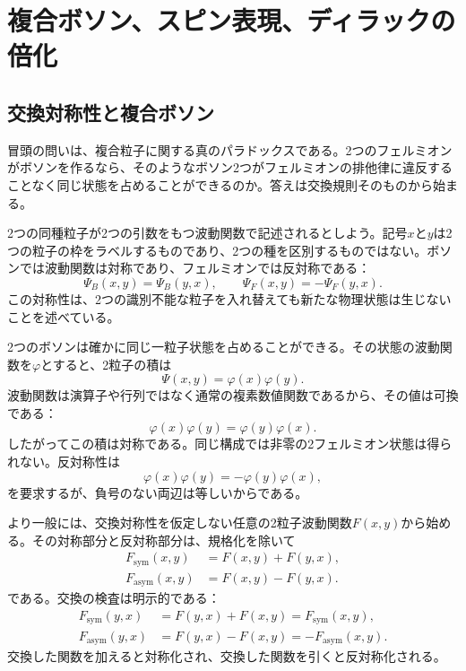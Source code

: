 \chapter{複合ボソン、スピン表現、ディラックの倍化}

\section{交換対称性と複合ボソン}

冒頭の問いは、複合粒子に関する真のパラドックスである。2つのフェルミオンがボソンを作るなら、そのようなボソン2つがフェルミオンの排他律に違反することなく同じ状態を占めることができるのか。答えは交換規則そのものから始まる。

2つの同種粒子が2つの引数をもつ波動関数で記述されるとしよう。記号\(x\)と\(y\)は2つの粒子の枠をラベルするものであり、2つの種を区別するものではない。ボソンでは波動関数は対称であり、フェルミオンでは反対称である：
\begin{equation}
\Psi_B(x,y)=\Psi_B(y,x),
\qquad
\Psi_F(x,y)=-\Psi_F(y,x).
\end{equation}
この対称性は、2つの識別不能な粒子を入れ替えても新たな物理状態は生じないことを述べている。

2つのボソンは確かに同じ一粒子状態を占めることができる。その状態の波動関数を\(\varphi\)とすると、2粒子の積は
\begin{equation}
\Psi(x,y)=\varphi(x)\varphi(y).
\end{equation}
波動関数は演算子や行列ではなく通常の複素数値関数であるから、その値は可換である：
\begin{equation}
\varphi(x)\varphi(y)=\varphi(y)\varphi(x).
\end{equation}
したがってこの積は対称である。同じ構成では非零の2フェルミオン状態は得られない。反対称性は
\begin{equation}
\varphi(x)\varphi(y)=-\varphi(y)\varphi(x),
\end{equation}
を要求するが、負号のない両辺は等しいからである。

より一般には、交換対称性を仮定しない任意の2粒子波動関数\(F(x,y)\)から始める。その対称部分と反対称部分は、規格化を除いて
\begin{align}
F_{\mathrm{sym}}(x,y)&=F(x,y)+F(y,x),\\
F_{\mathrm{asym}}(x,y)&=F(x,y)-F(y,x).
\end{align}
である。交換の検査は明示的である：
\begin{align}
F_{\mathrm{sym}}(y,x)
&=F(y,x)+F(x,y)
=F_{\mathrm{sym}}(x,y),\\
F_{\mathrm{asym}}(y,x)
&=F(y,x)-F(x,y)
=-F_{\mathrm{asym}}(x,y).
\end{align}
交換した関数を加えると対称化され、交換した関数を引くと反対称化される。

